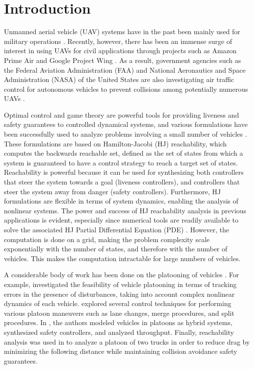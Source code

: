 \section{Introduction}
Unmanned aerial vehicle (UAV) systems have in the past been mainly used for military operations \cite{Tice91}. Recently, however, there has been an immense surge of interest in using UAVs for civil applications through projects such as Amazon Prime Air and Google Project Wing \cite{PrimeAir,ProjectWing,Debusk10}. As a result, government agencies such as the Federal Aviation Administration (FAA) and National Aeronautics and Space Administration (NASA) of the United States are also investigating air traffic control for autonomous vehicles to prevent collisions among potentially numerous UAVs \cite{FAA13}. 

Optimal control and game theory are powerful tools for providing liveness and safety guarantees to controlled dynamical systems, and various formulations \cite{Bokanowski10,Mitchell05,Barron89} have been successfully used to analyze problems involving a small number of vehicles \cite{Fisac15,Chen14,Ding08}. These formulations are based on Hamilton-Jacobi (HJ) reachability, which computes the backwards reachable set, defined as the set of states from which a system is guaranteed to have a control strategy to reach a target set of states. Reachability is powerful because it can be used for synthesizing both controllers that steer the system towards a goal (liveness controllers), and controllers that steer the system away from danger (safety controllers). Furthermore, HJ formulations are flexible in terms of system dynamics, enabling the analysis of nonlinear systems. The power and success of HJ reachability analysis in previous applications is evident, especially since numerical tools are readily available to solve the associated HJ Partial Differential Equation (PDE) \cite{LSToolbox,Osher02,Sethian96}. However, the computation is done on a grid, making the problem complexity scale exponentially with the number of states, and therefore with the number of vehicles. This makes the computation intractable for large numbers of vehicles. 

A considerable body of work has been done on the platooning of vehicles \cite{Kavathekar11}. For example, \cite{McMahon90} investigated the feasibility of vehicle platooning in terms of tracking errors in the presence of disturbances, taking into account complex nonlinear dynamics of each vehicle.  \cite{Hedrick92} explored several control techniques for performing various platoon maneuvers such as lane changes, merge procedures, and split procedures. In \cite{Lygeros98}, the authors modeled vehicles in platoons as hybrid systems, synthesized safety controllers, and analyzed throughput. Finally, reachability analysis was used in \cite{Alam11} to analyze a platoon of two trucks in order to reduce drag by minimizing the following distance while maintaining collision avoidance safety guarantees.

